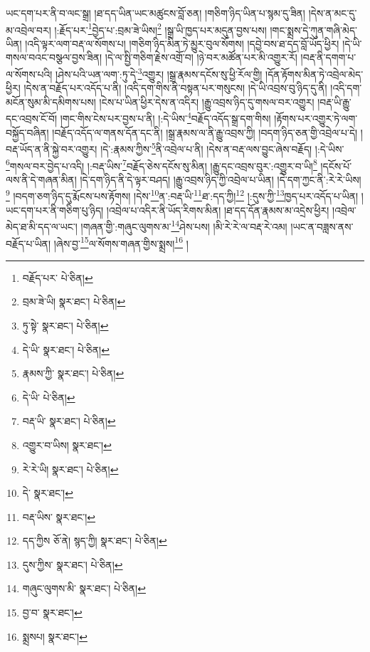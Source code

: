 ཡང་དག་པར་ནི་བ་ལང་སྒྲ། །ཐ་དད་ཡིན་ཡང་མཚུངས་བློ་ཅན། །གཅིག་ཉིད་ཡིན་པ་སྙམ་དུ་ཟིན། །དེས་ན་མང་དུ་མ་འབྲེལ་བར། །:རྗོད་པར་\footnote{བརྗོད་པར་  པེ་ཅིན། }བྱེད་པ་:བྲམ་ཟེ་ཡིས།\footnote{བྲམ་ཟེ་ཡི།  སྣར་ཐང་།  པེ་ཅིན། } །སྒྲ་ཡི་ཁྱད་པར་མདུན་བྱས་པས། །གང་སྨྲས་དེ་ཀུན་གཞི་མེད་ཡིན། །འདི་ལྟར་ལག་བརྡ་ལ་སོགས་པ། །གཅིག་ཉིད་མིན་ཏེ་མྱུར་བུལ་སོགས། །དབྱེ་བས་ཐ་དད་བློ་ཡོད་ཕྱིར། །དེ་ཡི་གསལ་བའང་བསྩལ་བྱས་ཟིན། །དེ་ལ་སྤྱི་གཅིག་རྗེས་འགྲོ་བ། །ཉེ་བར་མཚོན་པར་མི་འགྱུར་རོ། །བརྡ་ནི་དགག་པ་ལ་སོགས་པའི། །ཤེས་པའི་ཡན་ལག་:ཏུ་དེ་\footnote{ཏུ་སྟེ་  སྣར་ཐང་།  པེ་ཅིན། }འགྱུར། །སྒྲ་རྣམས་དངོས་སུ་ཕྱི་རོལ་གྱི། །དོན་རྟོགས་མིན་ཏེ་འབྲེལ་མེད་ཕྱིར། །དེས་ན་བརྗོད་པར་འདོད་པ་ནི། །འདི་དག་གིས་ནི་བསྟན་པར་གསུངས། །དེ་ཡི་འབྲས་བུ་ཉིད་དུ་ནི། །འདི་དག་མངོན་སུམ་མི་དམིགས་པས། །ངེས་པ་ཡིན་ཕྱིར་དེས་ན་འདིར། །རྒྱུ་འབྲས་ཉིད་དུ་གསལ་བར་འགྱུར། །བརྡ་ཡི་རྒྱུ་དང་འབྲས་ངོ་བོ། །གང་གིས་ངེས་པར་བྱས་པ་ནི། །:དེ་ཡིས་\footnote{དེ་ཡི་  སྣར་ཐང་།  པེ་ཅིན། }བརྗོད་འདོད་སྒྲ་དག་གིས། །རྟོགས་པར་འགྱུར་ཏེ་ལག་བསྐྱོད་བཞིན། །བརྗོད་འདོད་ལ་གནས་དོན་དང་ནི། །སྒྲ་རྣམས་ལ་ནི་རྒྱུ་འབྲས་ཀྱི། །བདག་ཉིད་ཅན་གྱི་འབྲེལ་པ་དེ། །བརྡ་ཡོད་ན་ནི་སྐྱེ་བར་འགྱུར། །དེ་:རྣམས་ཀྱིས་\footnote{རྣམས་ཀྱི་  སྣར་ཐང་།  པེ་ཅིན། }ནི་འབྲེལ་པ་ནི། །དེས་ན་བརྡ་ལས་བྱུང་ཞེས་བརྗོད། །:དེ་ཡིས་\footnote{དེ་ཡི་  པེ་ཅིན། }གསལ་བར་བྱེད་པ་འདི། །:བརྡ་ཡིས་\footnote{བརྡ་ཡི་  སྣར་ཐང་།  པེ་ཅིན། }བརྗོད་ཅེས་དངོས་སུ་མིན། །རྒྱུ་དང་འབྲས་བུར་:འགྱུར་བ་ཡི།\footnote{འགྱུར་བ་ཡིས།  སྣར་ཐང་། } །དངོས་པོ་ལས་ནི་དེ་གཞན་མིན། །དེ་དག་ཉིད་ནི་དེ་ལྟར་བཤད། །རྒྱུ་འབྲས་ཉིད་ཀྱི་འབྲེལ་པ་ཡིན། །དེ་དག་ཀྱང་ནི་:རེ་རེ་ཡིས།\footnote{རེ་རེ་ཡི།  སྣར་ཐང་།  པེ་ཅིན། } །བདག་ཅག་ཉིད་དུ་རྨོངས་པས་རྟོགས། །དེས་\footnote{དེ་  སྣར་ཐང་། }ན་:བརྡ་ཡི་\footnote{བརྡ་ཡིས་  སྣར་ཐང་། }ཐ་:དད་ཀྱི།\footnote{དད་ཀྱིས  ཅོ་ནེ། སྙད་ཀྱི།  སྣར་ཐང་།  པེ་ཅིན། } །:དུས་ཀྱི་\footnote{དུས་ཀྱིས་  སྣར་ཐང་།  པེ་ཅིན། }ཁྱད་པར་འདོད་པ་ཡིན། །ཡང་དག་པར་ནི་གཅིག་པུ་ཉིད། །འབྲེལ་པ་འདིར་ནི་ཡོད་རིགས་མིན། །ཐ་དད་དོན་རྣམས་མ་འདྲེས་ཕྱིར། །འབྲེལ་མེད་ཐ་མི་དད་ལ་ཡང་། །གཞན་གྱི་:གཞུང་ལུགས་མ་\footnote{གཞུང་ལུགས་མི་  སྣར་ཐང་།  པེ་ཅིན། }ཤེས་པས། །མི་རེ་རེ་ལ་བརྡ་རེ་འམ། །ཡང་ན་བཟླས་ནས་བརྗོད་པ་ཡིན། །ཞེས་བྱ་\footnote{བྱ་བ་  སྣར་ཐང་། }ལ་སོགས་གཞན་གྱིས་སྨྲས།\footnote{སྨྲསཔ།  སྣར་ཐང་། } །
